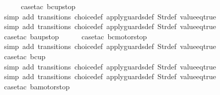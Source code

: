 \begin{isabellebody}
\ \ \ \ \isamarkupfalse%
\ {\isacharparenleft}case{\isacharunderscore}tac\ {\isachardoublequoteopen}bc{\isacharequal}up{}{}stop{\isachardoublequoteclose}{\isacharparenright}\isanewline
\ \ \ \ \ \isamarkupfalse%
\ {\isacharparenleft}simp\ add{\isacharcolon}\ transitions\ choice{\isacharunderscore}def\ apply{\isacharunderscore}guards{\isacharunderscore}def\ Str{\isacharunderscore}def\ value{\isacharunderscore}eq{\isacharunderscore}true{\isacharparenright}\isanewline
\ \ \ \ \ \isamarkupfalse%
\ {\isacharparenleft}simp\ add{\isacharcolon}\ transitions\ choice{\isacharunderscore}def\ apply{\isacharunderscore}guards{\isacharunderscore}def\ Str{\isacharunderscore}def\ value{\isacharunderscore}eq{\isacharunderscore}true{\isacharparenright}\isanewline
\ \ \ \isamarkupfalse%
\ {\isacharparenleft}case{\isacharunderscore}tac\ {\isachardoublequoteopen}ba{\isacharequal}up{}{}stop{\isachardoublequoteclose}{\isacharparenright}\isanewline
\ \ \ \ \isamarkupfalse%
\ {\isacharparenleft}case{\isacharunderscore}tac\ {\isachardoublequoteopen}bc{\isacharequal}motorstop\ {}{\isachardoublequoteclose}{\isacharparenright}\isanewline
\ \ \ \ \ \isamarkupfalse%
\ {\isacharparenleft}simp\ add{\isacharcolon}\ transitions\ choice{\isacharunderscore}def\ apply{\isacharunderscore}guards{\isacharunderscore}def\ Str{\isacharunderscore}def\ value{\isacharunderscore}eq{\isacharunderscore}true{\isacharparenright}\isanewline
\ \ \ \ \isamarkupfalse%
\ {\isacharparenleft}case{\isacharunderscore}tac\ {\isachardoublequoteopen}bc{\isacharequal}up{}{}{\isachardoublequoteclose}{\isacharparenright}\isanewline
\ \ \ \ \ \isamarkupfalse%
\ {\isacharparenleft}simp\ add{\isacharcolon}\ transitions\ choice{\isacharunderscore}def\ apply{\isacharunderscore}guards{\isacharunderscore}def\ Str{\isacharunderscore}def\ value{\isacharunderscore}eq{\isacharunderscore}true{\isacharparenright}\isanewline
\ \ \ \ \isamarkupfalse%
\ {\isacharparenleft}simp\ add{\isacharcolon}\ transitions\ choice{\isacharunderscore}def\ apply{\isacharunderscore}guards{\isacharunderscore}def\ Str{\isacharunderscore}def\ value{\isacharunderscore}eq{\isacharunderscore}true{\isacharparenright}\isanewline
\ \ \ \isamarkupfalse%
\ {\isacharparenleft}case{\isacharunderscore}tac\ {\isachardoublequoteopen}ba{\isacharequal}motorstop\ {}{\isachardoublequoteclose}{\isacharparenright}\isanewline

\end{isabellebody}
